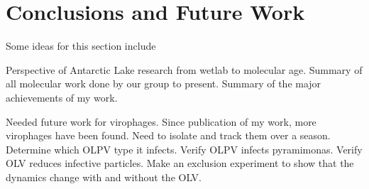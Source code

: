 \chapter{Conclusions and Future Work}
\label{ch:conc}
Some ideas for this section include


Perspective of Antarctic Lake research from wetlab to molecular age.
Summary of all molecular work done by our group to present.
Summary of the major achievements of my work.

Needed future work for virophages. Since publication of my work, more virophages have been found. 
Need to isolate and track them over a season.
Determine which OLPV type it infects.
Verify OLPV infects pyramimonas.
Verify OLV reduces infective particles.
Make an exclusion experiment to show that the dynamics change with and without
the OLV. 


 
